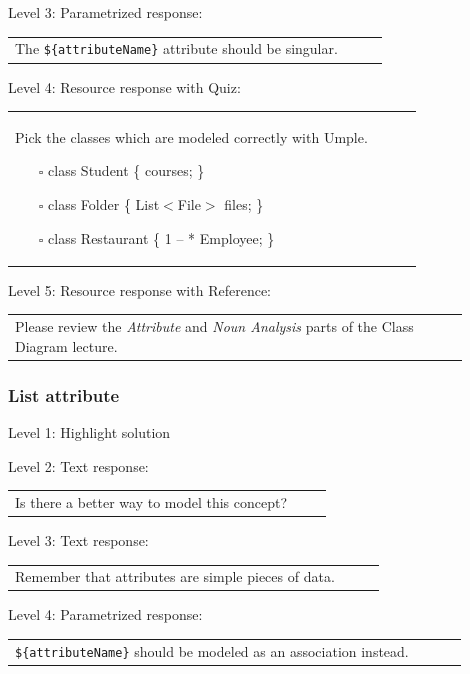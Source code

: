 \noindent Level 3: Parametrized response: \medskip

\begin{tabular}{|p{0.9\linewidth}}
The \verb|${attributeName}| attribute should be singular.
\end{tabular} \medskip

\noindent Level 4: Resource response with Quiz: \medskip

\begin{tabular}{|p{0.9\linewidth}}
Pick the classes which are modeled correctly with Umple.

\begin{itemize}
    \item[$\square$] class Student \{ courses; \}
    \item[$\square$] class Folder \{ List$<$File$>$ files; \}
    \item[$\square$] class Restaurant \{ 1 -- * Employee; \}
\end{itemize}

\end{tabular} \medskip

\noindent Level 5: Resource response with Reference: \medskip

\begin{tabular}{|p{0.9\linewidth}}
Please review the \textit{Attribute} and \textit{Noun Analysis} parts of the Class Diagram lecture.
\end{tabular} \medskip


\subsubsection{List attribute}

\noindent Level 1: Highlight solution  \medskip

\noindent Level 2: Text response: \medskip

\begin{tabular}{|p{0.9\linewidth}}
Is there a better way to model this concept?
\end{tabular} \medskip

\noindent Level 3: Text response: \medskip

\begin{tabular}{|p{0.9\linewidth}}
Remember that attributes are simple pieces of data.
\end{tabular} \medskip

\noindent Level 4: Parametrized response: \medskip

\begin{tabular}{|p{0.9\linewidth}}
\verb|${attributeName}| should be modeled as an association instead.
\end{tabular} \medskip

